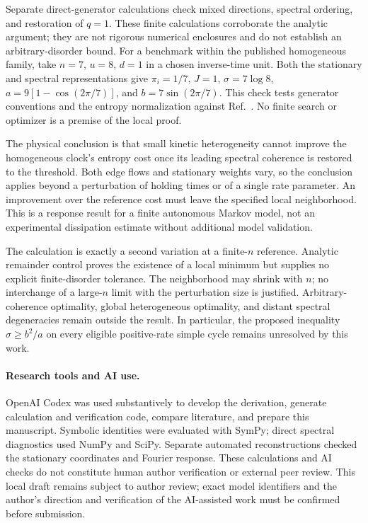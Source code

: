 \documentclass[aps,pre,onecolumn,11pt,notitlepage,nofootinbib]{revtex4-2}
\begin{document}
Separate direct-generator calculations check mixed directions, spectral ordering, and restoration of $q=1$. These finite calculations corroborate the analytic argument; they are not rigorous numerical enclosures and do not establish an arbitrary-disorder bound. For a benchmark within the published homogeneous family, take $n=7$, $u=8$, $d=1$ in a chosen inverse-time unit. Both the stationary and spectral representations give $\pi_i=1/7$, $J=1$, $\sigma=7\log8$, $a=9[1-\cos(2\pi/7)]$, and $b=7\sin(2\pi/7)$. This check tests generator conventions and the entropy normalization against Ref.~\cite{OBS2022}. No finite search or optimizer is a premise of the local proof.

The physical conclusion is that small kinetic heterogeneity cannot improve the homogeneous clock's entropy cost once its leading spectral coherence is restored to the threshold. Both edge flows and stationary weights vary, so the conclusion applies beyond a perturbation of holding times or of a single rate parameter. An improvement over the reference cost must leave the specified local neighborhood. This is a response result for a finite autonomous Markov model, not an experimental dissipation estimate without additional model validation.

The calculation is exactly a second variation at a finite-$n$ reference. Analytic remainder control proves the existence of a local minimum but supplies no explicit finite-disorder tolerance. The neighborhood may shrink with $n$; no interchange of a large-$n$ limit with the perturbation size is justified. Arbitrary-coherence optimality, global heterogeneous optimality, and distant spectral degeneracies remain outside the result. In particular, the proposed inequality $\sigma\geq b^2/a$ on every eligible positive-rate simple cycle remains unresolved by this work.

\paragraph*{Research tools and AI use.}
OpenAI Codex was used substantively to develop the derivation, generate calculation and verification code, compare literature, and prepare this manuscript. Symbolic identities were evaluated with SymPy; direct spectral diagnostics used NumPy and SciPy. Separate automated reconstructions checked the stationary coordinates and Fourier response. These calculations and AI checks do not constitute human author verification or external peer review. This local draft remains subject to author review; exact model identifiers and the author's direction and verification of the AI-assisted work must be confirmed before submission.
\end{document}
